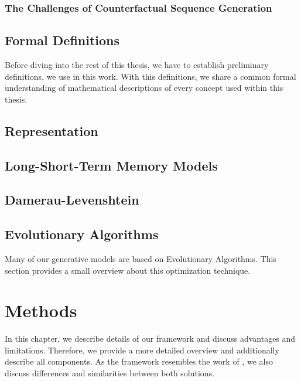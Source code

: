 \documentclass[12pt,a4paper]{report}
\begin{document}
\subsection{The Challenges of Counterfactual Sequence Generation}



\section{Formal Definitions}
\label{sec:formulas}
Before diving into the rest of this thesis, we have to establish preliminary definitions, we use in this work. With this definitions, we share a common formal understanding of mathematical descriptions of every concept used within this thesis. 


\section{Representation}
\label{sec:representation}


\section{Long-Short-Term Memory Models}
\label{sec:lstm}


\section{Damerau-Levenshtein}
\label{sec:damerau}


\section{Evolutionary Algorithms}
\label{sec:evo}
Many of our generative models are based on Evolutionary Algorithms. This section provides a small overview about this optimization technique.  



\chapter{Methods}
\label{ch:methods}
In this chapter, we describe details of our framework and discuss advantages and limitations. 
Therefore, we provide a more detailed overview and additionally describe all components. As the framework resembles the work of \citeauthor{hsieh_DiCE4ELInterpretingProcess_2021}\autocite{hsieh_DiCE4ELInterpretingProcess}, we also discuss differences and similarities between both solutions. 
\end{document}
